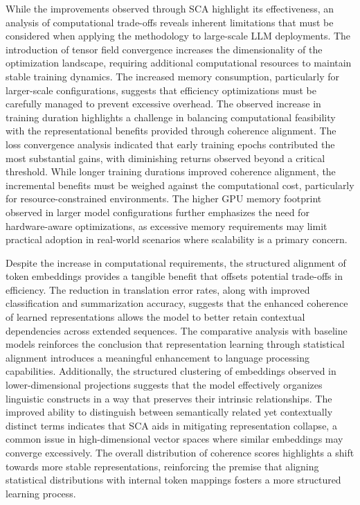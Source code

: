 \documentclass{article}
\begin{document}
While the improvements observed through SCA highlight its effectiveness, an analysis of computational trade-offs reveals inherent limitations that must be considered when applying the methodology to large-scale LLM deployments. The introduction of tensor field convergence increases the dimensionality of the optimization landscape, requiring additional computational resources to maintain stable training dynamics. The increased memory consumption, particularly for larger-scale configurations, suggests that efficiency optimizations must be carefully managed to prevent excessive overhead. The observed increase in training duration highlights a challenge in balancing computational feasibility with the representational benefits provided through coherence alignment. The loss convergence analysis indicated that early training epochs contributed the most substantial gains, with diminishing returns observed beyond a critical threshold. While longer training durations improved coherence alignment, the incremental benefits must be weighed against the computational cost, particularly for resource-constrained environments. The higher GPU memory footprint observed in larger model configurations further emphasizes the need for hardware-aware optimizations, as excessive memory requirements may limit practical adoption in real-world scenarios where scalability is a primary concern.

Despite the increase in computational requirements, the structured alignment of token embeddings provides a tangible benefit that offsets potential trade-offs in efficiency. The reduction in translation error rates, along with improved classification and summarization accuracy, suggests that the enhanced coherence of learned representations allows the model to better retain contextual dependencies across extended sequences. The comparative analysis with baseline models reinforces the conclusion that representation learning through statistical alignment introduces a meaningful enhancement to language processing capabilities. Additionally, the structured clustering of embeddings observed in lower-dimensional projections suggests that the model effectively organizes linguistic constructs in a way that preserves their intrinsic relationships. The improved ability to distinguish between semantically related yet contextually distinct terms indicates that SCA aids in mitigating representation collapse, a common issue in high-dimensional vector spaces where similar embeddings may converge excessively. The overall distribution of coherence scores highlights a shift towards more stable representations, reinforcing the premise that aligning statistical distributions with internal token mappings fosters a more structured learning process.
\end{document}
